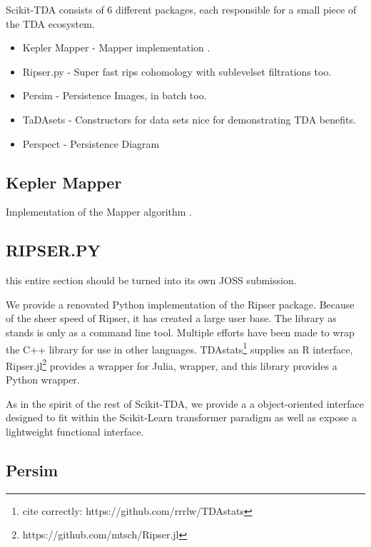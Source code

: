 \documentclass[letterpaper, 10 pt, conference]{ieeeconf}  %
\begin{document}
Scikit-TDA consists of 6 different packages, each responsible for a small piece of the TDA ecosystem.

\begin{itemize}
    \item Kepler Mapper - Mapper implementation \cite{KeplerMapper2017}.
    \item Ripser.py - Super fast rips cohomology with sublevelset filtrations too.
    \item Persim - Persistence Images, in batch too.
    \item TaDAsets - Constructors for data sets nice for demonstrating TDA benefits.
    \item Perspect - Persistence Diagram 
\end{itemize}

\subsection{Kepler Mapper}

Implementation of the Mapper algorithm \cite{singh2007topological}.

\subsection{RIPSER.PY}

\begin{framed}
this entire section should be turned into its own JOSS submission.
\end{framed}

We provide a renovated Python implementation of the Ripser package.  Because of the sheer speed of Ripser, it has created a large user base. The library as stands is only as a command line tool. Multiple efforts have been made to wrap the C++ library for use in other languages.  TDAstats\footnote{cite correctly: https://github.com/rrrlw/TDAstats} supplies an R interface, Ripser.jl\footnote{https://github.com/mtsch/Ripser.jl} provides a wrapper for Julia, wrapper, and this library provides a Python wrapper. 

As in the spirit of the rest of Scikit-TDA, we provide a a object-oriented interface designed to fit within the Scikit-Learn transformer paradigm \cite{scikit-learn} as well as expose a lightweight functional interface.

\subsection{Persim}
\end{document}
